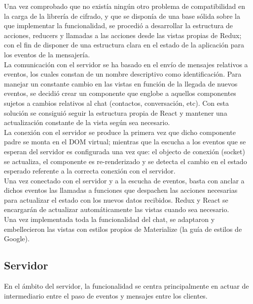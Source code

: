 Una vez comprobado que no existía ningún otro problema de compatibilidad en la carga de la librería de cifrado, y que se disponía de una base sólida sobre la que implementar la funcionalidad, se procedió a desarrollar la estructura de acciones, reducers y llamadas a las acciones desde las vistas propias de Redux; con el fin de disponer de una estructura clara en el estado de la aplicación para los eventos de la mensajería. \\

La comunicación con el servidor se ha basado en el envío de mensajes relativos a eventos, los cuales constan de un nombre descriptivo como identificación. Para manejar un constante cambio en las vistas en función de la llegada de nuevos eventos, se decidió crear un componente que englobe a aquellos componentes sujetos a cambios relativos al chat (contactos, conversación, etc). Con esta solución se consiguió seguir la estructura propia de React y mantener una actualización constante de la vista según sea necesario. \\

La conexión con el servidor se produce la primera vez que dicho componente padre se monta en el DOM virtual; mientras que la escucha a los eventos que se esperan del servidor es configurada una vez que: el objecto de conexión (socket) se actualiza, el componente es re-renderizado y se detecta el cambio en el estado esperado referente a la correcta conexión con el servidor. \\

Una vez conectado con el servidor y a la escucha de eventos, basta con anclar a dichos eventos las llamadas a funciones que despachen las acciones necesarias para actualizar el estado con los nuevos datos recibidos. Redux y React se encargarán de actualizar automáticamente las vistas cuando sea necesario. \\

Una vez implementada toda la funcionalidad del chat, se adaptaron y embellecieron las vistas con estilos propios de Materialize (la guía de estilos de Google). \\


\subsection{Servidor}

En el ámbito del servidor, la funcionalidad se centra principalmente en actuar de intermediario entre el paso de eventos y mensajes entre los clientes. \\ 

